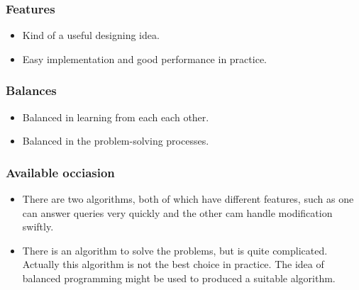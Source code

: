 \begin{frame}
	\frametitle{Features}
	\begin{itemize}
		\item Kind of a useful designing idea.\pause
		\item Easy implementation and good performance in practice.
	\end{itemize}
\end{frame}
\begin{frame}
	\frametitle{Balances}
	\begin{itemize}
		\item Balanced in learning from each each other.\pause
		\item Balanced in the problem-solving processes.
	\end{itemize}
\end{frame}
\begin{frame}
	\frametitle{Available occiasion}
	\begin{itemize}
		\item There are two algorithms, both of which have different features, such as one can
		answer queries very quickly and the other cam handle modification swiftly.\pause
		\item There is an algorithm to solve the problems, but is quite complicated. Actually this algorithm
		is not the best choice in practice. The idea of balanced programming might be used to produced a suitable algorithm.
	\end{itemize}
\end{frame}
